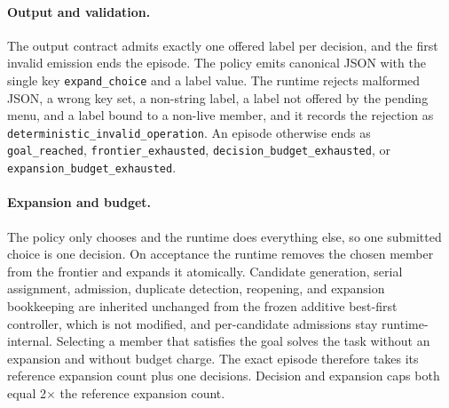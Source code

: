 \paragraph{Output and validation.}
The output contract admits exactly one offered label per decision, and the first invalid emission ends the episode. The policy emits canonical JSON with the single key \texttt{expand\_choice} and a label value. The runtime rejects malformed JSON, a wrong key set, a non-string label, a label not offered by the pending menu, and a label bound to a non-live member, and it records the rejection as \texttt{deterministic\_invalid\_operation}. An episode otherwise ends as \texttt{goal\_reached}, \texttt{frontier\_exhausted}, \texttt{decision\_budget\_exhausted}, or \texttt{expansion\_budget\_exhausted}.

\paragraph{Expansion and budget.}
The policy only chooses and the runtime does everything else, so one submitted choice is one decision. On acceptance the runtime removes the chosen member from the frontier and expands it atomically. Candidate generation, serial assignment, admission, duplicate detection, reopening, and expansion bookkeeping are inherited unchanged from the frozen additive best-first controller, which is not modified, and per-candidate admissions stay runtime-internal. Selecting a member that satisfies the goal solves the task without an expansion and without budget charge. The exact episode therefore takes its reference expansion count plus one decisions. Decision and expansion caps both equal 2$\times$ the reference expansion count.

